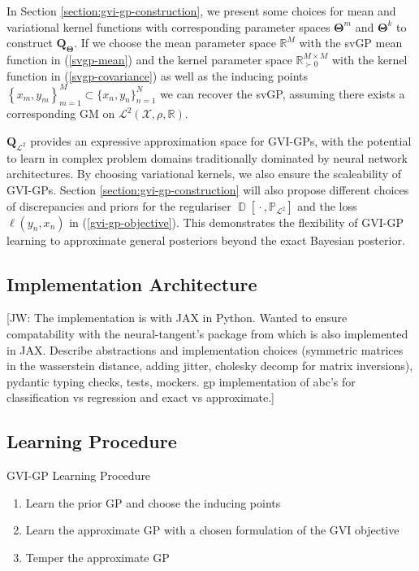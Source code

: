 \documentclass{article}
\newcommand{\jw}[1]{{\color{gray} [JW: #1]}}
\newcommand{\D}{\operatorname{\mathbb{D}}}
\newcommand{\wc}{\operatorname{{}\cdot{}}}
\numberwithin{equation}{section}
\begin{document}
In Section \ref{section:gvi-gp-construction}, we present some choices for mean and variational kernel functions with corresponding parameter spaces $\boldsymbol{\Theta}^m$ and $\boldsymbol{\Theta}^k$ to construct $\boldsymbol{Q}_{\boldsymbol{\Theta}}$. 
If we choose the mean parameter space $\mathbb{R}^M$ with the svGP mean function in (\ref{svgp-mean}) and the kernel parameter space $\mathbb{R}^{M\times M}_{\succ 0}$ with the kernel function in (\ref{svgp-covariance}) as well as the inducing points $\left\{x_m, y_m\right\}_{m=1}^{M} \subset \{x_n, y_n\}_{n=1}^{N}$ we can recover the svGP, assuming there exists a corresponding GM on $\mathcal{L}^2(\mathcal{X}, \rho, \mathbb{R})$. 

$\boldsymbol{Q}_{\mathcal{L}^2}$ provides an expressive approximation space for GVI-GPs, with the potential to learn in complex problem domains traditionally dominated by neural network architectures.
By choosing variational kernels, we also ensure the scaleability of GVI-GPs. 
Section \ref{section:gvi-gp-construction} will also propose different choices of discrepancies and priors for the regulariser $\D\left[\wc, \mathbb{P}_{\mathcal{L}^2}\right]$ and the loss $\ell(y_n, x_n)$ in (\ref{gvi-gp-objective}). This demonstrates the flexibility of GVI-GP learning to approximate general posteriors beyond the exact Bayesian posterior.

\subsection{Implementation Architecture}

\jw{The implementation is with JAX in Python. Wanted to ensure compatability with the neural-tangent's package from \cite{novak2019neural} which is also implemented in JAX. Describe abstractions and implementation choices (symmetric matrices in the wasserstein distance, adding jitter, cholesky decomp for matrix inversions), pydantic typing checks, tests, mockers. gp implementation of abc's for classification vs regression and exact vs approximate.}

\subsection{Learning Procedure}

\begin{algorithm}
\caption{GVI-GP Learning Procedure}\label{alg:gvi-gp}
\begin{algorithmic}
\begin{enumerate}
    \item Learn the prior GP and choose the inducing points
    \item Learn the approximate GP with a chosen formulation of the GVI objective
    \item Temper the approximate GP
\end{enumerate}
\end{algorithmic}
\end{algorithm}
\end{document}
